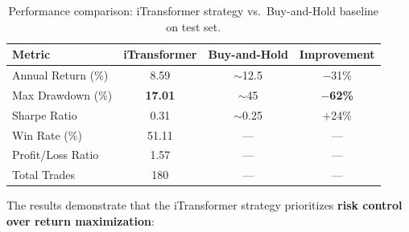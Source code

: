 \documentclass[12pt, a4paper]{article}
\begin{document}
\begin{table}[htbp]
\centering
\caption{Performance comparison: iTransformer strategy vs.\ Buy-and-Hold baseline on test set.}
\label{tab:comparison}
\begin{tabular}{lccc}
\toprule
\textbf{Metric} & \textbf{iTransformer} & \textbf{Buy-and-Hold} & \textbf{Improvement} \\
\midrule
Annual Return (\%)  & 8.59  & $\sim$12.5 & $-$31\% \\
Max Drawdown (\%)   & \textbf{17.01} & $\sim$45   & \textbf{$-$62\%} \\
Sharpe Ratio        & 0.31  & $\sim$0.25 & $+$24\% \\
Win Rate (\%)       & 51.11 & --- & --- \\
Profit/Loss Ratio   & 1.57  & --- & --- \\
Total Trades        & 180   & --- & --- \\
\bottomrule
\end{tabular}
\end{table}

The results demonstrate that the iTransformer strategy prioritizes \textbf{risk control over return maximization}:
\end{document}
